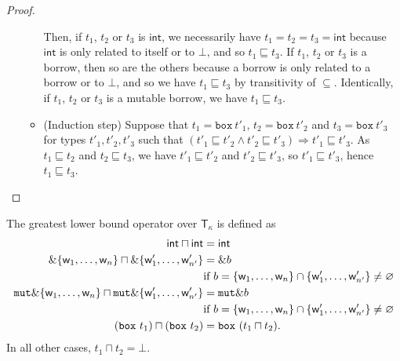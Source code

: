 \begin{proof}
\begin{itemize}
\begin{itemize}
      Then, if $t_1$, $t_2$ or $t_3$ is $\mathsf{int}$, we necessarily have
      $t_1=t_2=t_3=\mathsf{int}$ because $\mathsf{int}$ is only related to
      itself or to $\bot$, and so $t_1\sqsubseteq t_3$.
      If $t_1$, $t_2$ or $t_3$ is a borrow, then so are the others because
      a borrow is only related to a borrow or to $\bot$, and so we have
      $t_1\sqsubseteq t_3$ by transitivity of $\subseteq$.
      Identically, if $t_1$, $t_2$ or $t_3$ is a mutable borrow, we have
      $t_1\sqsubseteq t_3$.
      \item (Induction step) Suppose that $t_1=\mathtt{box}\ t'_1$,
      $t_2=\mathtt{box}\ t'_2$ and $t_3=\mathtt{box}\ t'_3$ for types
      $t'_1,t'_2,t'_3$ such that
      $(t'_1 \sqsubseteq t'_2 \land t'_2 \sqsubseteq t'_3) \Rightarrow
      t'_1 \sqsubseteq t'_3$.
      As $t_1 \sqsubseteq t_2$ and $t_2 \sqsubseteq t_3$, we have
      $t'_1 \sqsubseteq t'_2$ and $t'_2 \sqsubseteq t'_3$, so
      $t'_1 \sqsubseteq t'_3$, hence $t_1 \sqsubseteq t_3$.
    \end{itemize}
  \end{itemize}
\end{proof}

\begin{definition}
  The greatest lower bound operator over $\mathsf{T}_\kappa$ is defined as
  \begin{align*}
    \mathsf{int}\sqcap\mathsf{int} &= \mathsf{int}\\
    \borrow\{\mathsf{w}_1,\ldots,\mathsf{w}_n\} \sqcap \borrow\{\mathsf{w}'_1,\ldots,\mathsf{w}'_{n'}\} &= \borrow b\\
    & \text{if $b=\{\mathsf{w}_1,\ldots,\mathsf{w}_n\}\cap\{\mathsf{w}'_1,\ldots,\mathsf{w}'_{n'}\}\not=\varnothing$}\\
    \mathtt{mut}\borrow\{\mathsf{w}_1,\ldots,\mathsf{w}_n\} \sqcap \mathtt{mut}\borrow\{\mathsf{w}'_1,\ldots,\mathsf{w}'_{n'}\} &= \mathtt{mut}\borrow b\\
    & \text{if $b=\{\mathsf{w}_1,\ldots,\mathsf{w}_n\}\cap\{\mathsf{w}'_1,\ldots,\mathsf{w}'_{n'}\}\not=\varnothing$}\\
    (\mathtt{box}\ t_1) \sqcap (\mathtt{box}\ t_2) &=\mathtt{box}\ (t_1\sqcap t_2).
  \end{align*}
  In all other cases, $t_1\sqcap t_2=\bot$.
\end{definition}

